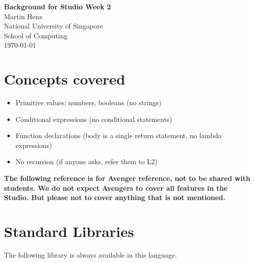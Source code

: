


        
  \thispagestyle{empty}
  
\begin{center}
  {\Large {\bf Background for Studio Week 2}}\\[10mm]

  {\large Martin Henz}\\[5mm]

  {\large National University of Singapore \\
          School of Computing}\\[10mm]

  {\large \today}\\[10mm]
\end{center}
\section{Concepts covered}

\begin{itemize}
\item Primitive values: numbers, booleans (no strings)
\item Conditional expressions (no conditional statements)
\item Function declarations (body is a single return statement, no lambda expressions)
\item No recursion (if anyone asks, refer them to L2)
\end{itemize}

\textbf{The following reference is for Avenger reference, not to be shared with students.
We do not expect Avengers to cover all features in the Studio. But please 
not to cover anything that is not mentioned.}





\newpage













\section{Standard Libraries}

The following library is always available in this language.






    
